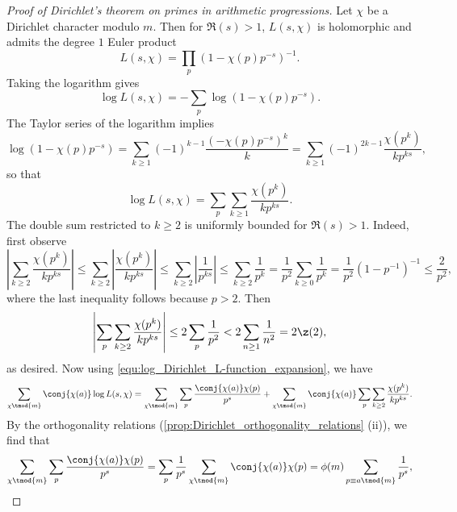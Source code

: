       \begin{proof}[Proof of Dirichlet's theorem on primes in arithmetic progressions]
          Let $\chi$ be a Dirichlet character modulo $m$. Then for $\Re(s) > 1$, $L(s,\chi)$ is holomorphic and admits the degree $1$ Euler product
          \[
            L(s,\chi) = \prod_{p}(1-\chi(p)p^{-s})^{-1}.
          \]
          Taking the logarithm gives
          \[
            \log L(s,\chi) = -\sum_{p}\log(1-\chi(p)p^{-s}).
          \]
          The Taylor series of the logarithm implies
          \[
            \log(1-\chi(p)p^{-s}) = \sum_{k \ge 1}(-1)^{k-1}\frac{(-\chi(p)p^{-s})^{k}}{k} = \sum_{k \ge 1}(-1)^{2k-1}\frac{\chi(p^{k})}{kp^{ks}},
          \]
          so that
          \begin{equation}\label{equ:log_Dirichlet_L-function_expansion}
            \log L(s,\chi) = \sum_{p}\sum_{k \ge 1}\frac{\chi(p^{k})}{kp^{ks}}.
          \end{equation}
          The double sum restricted to $k \ge 2$ is uniformly bounded for $\Re(s) > 1$. Indeed, first observe
          \[
            \left|\sum_{k \ge 2}\frac{\chi(p^{k})}{kp^{ks}}\right| \le \sum_{k \ge 2}\left|\frac{\chi(p^{k})}{kp^{ks}}\right| \le \sum_{k \ge 2}\left|\frac{1}{p^{ks}}\right| \le \sum_{k \ge 2}\frac{1}{p^{k}} = \frac{1}{p^{2}}\sum_{k \ge 0}\frac{1}{p^{k}} = \frac{1}{p^{2}}(1-p^{-1})^{-1} \le \frac{2}{p^{2}},
          \]
          where the last inequality follows because $p > 2$. Then
          \[
            \left|\sum_{p}\sum_{k \ge 2}\frac{\chi(p^{k})}{kp^{ks}}\right| \le 2\sum_{p}\frac{1}{p^{2}} < 2\sum_{n \ge 1}\frac{1}{n^{2}} = 2\z(2),
          \]
          as desired. Now using \cref{equ:log_Dirichlet_L-function_expansion}, we have
          \begin{equation}\label{equ:Dirichlet's_theorem_on_primes_in_arithmetric_progressions_1}
            \sum_{\chi \tmod{m}}\conj{\chi(a)}\log L(s,\chi) = \sum_{\chi \tmod{m}}\sum_{p}\frac{\conj{\chi(a)}\chi(p)}{p^{s}}+\sum_{\chi \tmod{m}}\conj{\chi(a)}\sum_{p}\sum_{k \ge 2}\frac{\chi(p^{k})}{kp^{ks}}.
          \end{equation}
          By the orthogonality relations (\cref{prop:Dirichlet_orthogonality_relations} (ii)), we find that
          \begin{equation}\label{equ:Dirichlet's_theorem_on_primes_in_arithmetric_progressions_2}
            \sum_{\chi \tmod{m}}\sum_{p}\frac{\conj{\chi(a)}\chi(p)}{p^{s}} = \sum_{p}\frac1{p^{s}}\sum_{\chi \tmod{m}}\conj{\chi(a)}\chi(p) = \phi(m)\sum_{p \equiv{a} \tmod{m}}\frac{1}{p^{s}},

\end{equation}
\end{proof}

